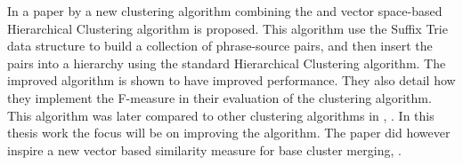 
In a paper by \cite{Chim2007} a new clustering algorithm combining the \STC and vector space-based Hierarchical Clustering algorithm is proposed. This algorithm use the Suffix Trie data structure to build a collection of phrase-source pairs, and then insert the pairs into a hierarchy using the standard Hierarchical Clustering algorithm. The improved algorithm is shown to have improved performance. They also detail how they implement the F-measure in their evaluation of the clustering algorithm. This algorithm was later compared to other clustering algorithms in , \cite{Chim2008}. In this thesis work the focus will be on improving the \CTC algorithm. The paper did however inspire a new vector based similarity measure for base cluster merging, \cite{Moe2013}.